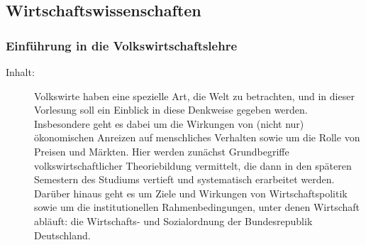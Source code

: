 \documentclass[%
a4paper, %
11pt,               %
leqno,              %
fleqn,              %
]
{scrartcl}
\begin{document}


\subsection{Wirtschaftswissenschaften} %
\label{sub:Wirtschaftswissenschaften}

\subsubsection{Einführung in die Volkswirtschaftslehre} %
\label{ssub:Einführung in die Volkswirtschaftslehre}

\begin{description}
  \item[Inhalt:] Volkswirte haben eine spezielle Art, die Welt zu betrachten,
    und in dieser Vorlesung soll ein Einblick in diese Denkweise gegeben werden.
    Insbesondere geht es dabei um die Wirkungen von (nicht nur) ökonomischen
    Anreizen auf menschliches Verhalten sowie um die Rolle von Preisen und
    Märkten. Hier werden zunächst Grundbegriffe volkswirtschaftlicher
    Theoriebildung vermittelt, die dann in den späteren Semestern des Studiums
    vertieft und systematisch erarbeitet werden. Darüber hinaus geht es um Ziele
    und Wirkungen von Wirtschaftspolitik sowie um die institutionellen
    Rahmenbedingungen, unter denen Wirtschaft abläuft: die Wirtschafts- und
    Sozialordnung der Bundesrepublik Deutschland.
\end{description}



\end{document}
